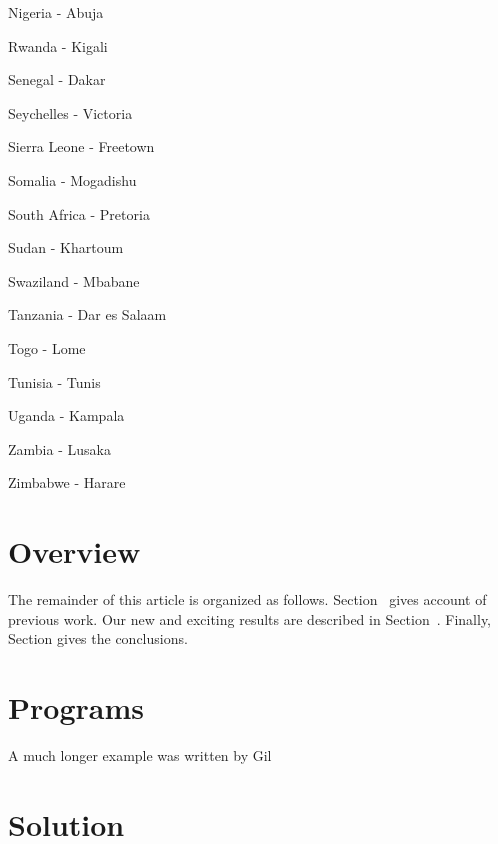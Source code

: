 \documentclass[12pt]{article}
\begin{document}
\begin{multicols}{3}
\begin{enumerate*}
\item Nigeria - Abuja
\item Rwanda - Kigali
\item Senegal - Dakar
\item Seychelles - Victoria
\item Sierra Leone - Freetown
\item Somalia - Mogadishu
\item South Africa - Pretoria 
\item Sudan - Khartoum
\item Swaziland - Mbabane
\item Tanzania - Dar es Salaam
\item Togo - Lome
\item Tunisia - Tunis
\item Uganda - Kampala
\item Zambia - Lusaka
\item Zimbabwe - Harare
\end{enumerate*}
\end{multicols}

\section{Overview}
The remainder of this article is organized as follows.
Section~ gives account of previous work.
Our new and exciting results are described in Section~.
Finally, Section gives the conclusions.

\section{Programs}
A much longer  example was written by Gil

\section{Solution}
\end{document}
